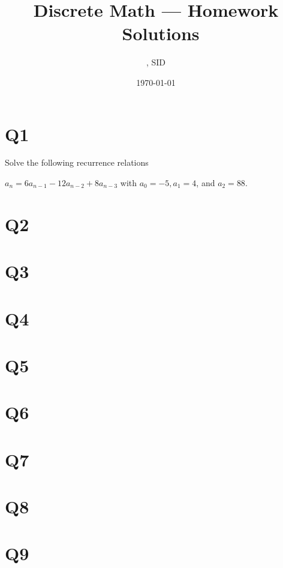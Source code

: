 \documentclass[11pt]{article}
\title{Discrete Math --- Homework \Homework \ Solutions}
\author{\Name, SID \SID}
\date{\today}
\begin{document}
\maketitle

\section*{Q1}
Solve the following recurrence relations
\begin{qparts}
    
    \item $a_n=6a_{n-1}-12a_{n-2}+8a_{n-3}$ with 
    $a_0=-5,a_1=4$, and $a_2=88$.
    \begin{solution}
        
    \end{solution}

\end{qparts}


\section*{Q2}


\section*{Q3}


\section*{Q4}


\section*{Q5}


\section*{Q6}


\section*{Q7}


\section*{Q8}

\section*{Q9}
\end{document}
